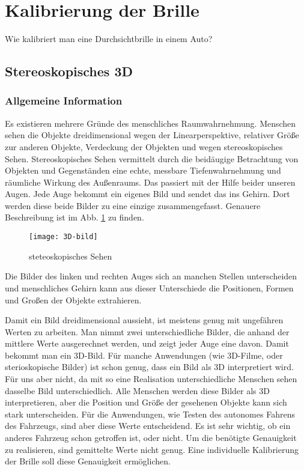 \section{Kalibrierung der Brille}

Wie kalibriert man eine Durchsichtbrille in einem Auto?

\subsection{Stereoskopisches 3D}

\subsubsection{Allgemeine Information}
Es existieren mehrere Gründe des menschliches Raumwahrnehmung.
Menschen sehen die Objekte dreidimensional wegen der Linearperspektive, relativer Größe zur anderen Objekte, Verdeckung der Objekten und wegen stereoskopisches Sehen. 
Stereoskopisches Sehen vermittelt durch die beidäugige Betrachtung von Objekten und Gegenständen eine echte, messbare Tiefenwahrnehmung und räumliche Wirkung des Außenraums. 
Das passiert mit der Hilfe beider unseren Augen.
Jede Auge bekommt ein eigenes Bild und sendet das ins Gehirn. 
Dort werden diese beide Bilder zu eine einzige zusammengefasst.
Genauere Beschreibung ist im Abb. \ref{fig:3D} zu finden.

\begin{figure}[h]
   \centering
   \texttt{[image: 3D-bild]}
   \caption{steteoskopisches Sehen}
   \label{fig:3D}
\end{figure}

Die Bilder des linken und rechten Auges sich an manchen Stellen unterscheiden und menschliches Gehirn kann aus dieser Unterschiede die Positionen, Formen und Großen der Objekte extrahieren.

Damit ein Bild dreidimensional aussieht, ist meistens genug mit ungefähren Werten zu arbeiten.
Man nimmt zwei unterschiedliche Bilder, die anhand der mittlere Werte ausgerechnet werden, und zeigt jeder Auge eine davon. 
Damit bekommt man ein 3D-Bild. 
Für manche Anwendungen (wie 3D-Filme, oder sterioskopische Bilder) ist schon genug,  dass ein Bild als 3D interpretiert wird. 
Für uns aber nicht, da mit so eine Realisation unterschiedliche Menschen sehen dasselbe Bild unterschiedlich.
Alle Menschen werden diese Bilder als 3D interpretieren, aber die Position und Größe der gesehenen Objekte kann sich stark unterscheiden.
Für die Anwendungen, wie Testen des autonomes Fahrens des Fahrzeugs, sind aber diese Werte entscheidend.
Es ist sehr wichtig, ob ein anderes Fahrzeug schon getroffen ist, oder nicht.
Um die benötigte Genauigkeit zu realisieren, sind gemittelte Werte nicht genug.
Eine individuelle Kalibrierung der Brille soll diese Genauigkeit ermöglichen.

